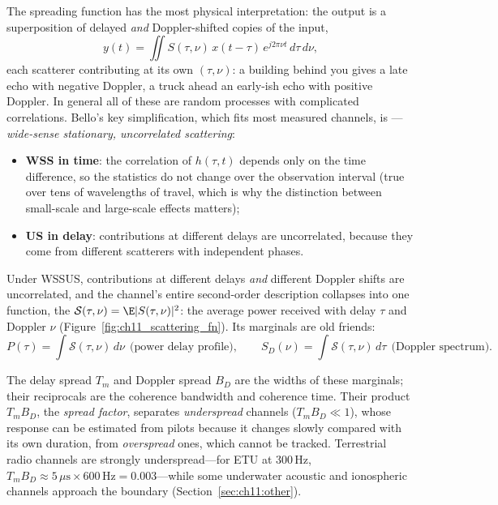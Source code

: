 The spreading function has the most physical interpretation: the output is a superposition of
delayed \emph{and} Doppler-shifted copies of the input,
\begin{equation}
y(t)=\iint S(\tau,\nu)\,x(t-\tau)\,e^{j2\pi\nu t}\,d\tau\,d\nu ,
\end{equation}
each scatterer contributing at its own $(\tau,\nu)$: a building behind you gives a late echo with
negative Doppler, a truck ahead an early-ish echo with positive Doppler. In general all of these are
random processes with complicated correlations. Bello's key simplification, which fits most
measured channels, is ---\emph{wide-sense stationary, uncorrelated scattering}:
\begin{itemize}
\item \textbf{WSS in time}: the correlation of $h(\tau,t)$ depends only on the time difference, so
the statistics do not change over the observation interval (true over tens of wavelengths of
travel, which is why the distinction between small-scale and large-scale effects matters);
\item \textbf{US in delay}: contributions at different delays are uncorrelated, because they come
from different scatterers with independent phases.
\end{itemize}
Under WSSUS, contributions at different delays \emph{and} different Doppler shifts are uncorrelated,
and the channel's entire second-order description collapses into one function, the
 $\mathcal{S}(\tau,\nu)=\E|S(\tau,\nu)|^2$: the average power
received with delay $\tau$ and Doppler $\nu$ (Figure~\ref{fig:ch11_scattering_fn}). Its marginals are
old friends:
\begin{equation}
P(\tau)=\int\mathcal S(\tau,\nu)\,d\nu\ \ \text{(power delay profile)},\qquad
S_D(\nu)=\int\mathcal S(\tau,\nu)\,d\tau\ \ \text{(Doppler spectrum)}.
\end{equation}


The delay spread $T_m$ and Doppler spread $B_D$ are the widths of these marginals; their reciprocals
are the coherence bandwidth and coherence time. Their product $T_mB_D$, the \emph{spread factor},
separates \emph{underspread} channels ($T_mB_D\ll1$), whose response can be estimated from pilots
because it changes slowly compared with its own duration, from \emph{overspread} ones, which cannot be
tracked. Terrestrial radio channels are strongly underspread---for ETU at 300\,Hz,
$T_mB_D\approx5\,\mu\text{s}\times600\,\text{Hz}=0.003$---while some underwater acoustic and
ionospheric channels approach the boundary (Section~\ref{sec:ch11:other}).

